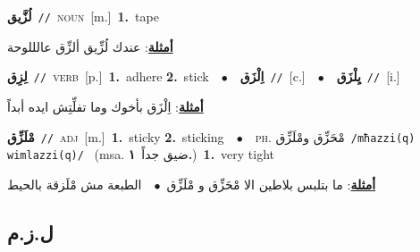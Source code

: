 \documentclass[10pt,a4paper,twoside]{article} %
\begin{document}
\begin{multicols}{2}
{\setlength\topsep{0pt}\textbf{\foreignlanguage{arabic}{لُزَّيق}}\ {\color{gray}\texttt{//}\color{black}}\ \textsc{noun}\ [m.]\ \textbf{1.}~tape\  \begin{flushright}\color{gray}\foreignlanguage{arabic}{\textbf{\underline{\foreignlanguage{arabic}{أمثلة}}}: عندك لُزِّيق ألزِّق عالللوحة}\end{flushright}\color{black}} \vspace{2mm}

{\setlength\topsep{0pt}\textbf{\foreignlanguage{arabic}{لِزِق}}\ {\color{gray}\texttt{//}\color{black}}\ \textsc{verb}\ [p.]\ \textbf{1.}~adhere  \textbf{2.}~stick\ \ $\bullet$\ \ \setlength\topsep{0pt}\textbf{\foreignlanguage{arabic}{اِلْزَق}}\ {\color{gray}\texttt{//}\color{black}}\ [c.]\ \ $\bullet$\ \ \setlength\topsep{0pt}\textbf{\foreignlanguage{arabic}{يِلْزَق}}\ {\color{gray}\texttt{//}\color{black}}\ [i.]\  \begin{flushright}\color{gray}\foreignlanguage{arabic}{\textbf{\underline{\foreignlanguage{arabic}{أمثلة}}}: اِلْزَق بأخوك وما تفلِّتِش ايده أبداً}\end{flushright}\color{black}} \vspace{2mm}

{\setlength\topsep{0pt}\textbf{\foreignlanguage{arabic}{مْلَزِّق}}\ {\color{gray}\texttt{//}\color{black}}\ \textsc{adj}\ [m.]\ \textbf{1.}~sticky  \textbf{2.}~sticking\ \ $\bullet$\ \ \textsc{ph.} \color{gray} \foreignlanguage{arabic}{مْحَزِّق ومْلَزِّق}\color{black}\ {\color{gray}\texttt{/{\sffamily mħazzi(q) wimlazzi(q)}/}\color{black}}\ \color{gray} (msa. \foreignlanguage{arabic}{ضيق جداً}~\foreignlanguage{arabic}{\textbf{١.}})\color{black}\ \textbf{1.}~very tight\  \begin{flushright}\color{gray}\foreignlanguage{arabic}{\textbf{\underline{\foreignlanguage{arabic}{أمثلة}}}: ما بتلبس بلاطين الا مْحَزِّق و مْلَزِّق\ $\bullet$\ \  الطبعة مش مْلَزقة بالحيط}\end{flushright}\color{black}} \vspace{2mm}

\vspace{-3mm}
\subsection*{\color{blue}\foreignlanguage{arabic}{ل.ز.م}\color{blue}{}} 


\end{multicols}
\end{document}
